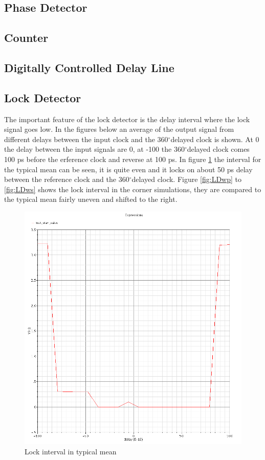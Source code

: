 \documentclass[a4paper,12pt]{article} \usepackage{graphicx}
\newcommand{\degree}{\ensuremath{^\circ}}
\begin{document}
\subsection{Phase Detector}
\subsection{Counter}
\subsection{Digitally Controlled Delay Line}
\subsection{Lock Detector}
The important feature of the lock detector is the delay interval where
the lock signal goes low. In the figures below an average of the
output signal from different delays between the input clock and the
360\degree delayed clock is shown. At 0 the delay between the input
signals are 0, at -100 the 360\degree delayed clock comes 100 ps
before the erference clock and reverse at 100 ps. In figure
\ref{fig:LDtm} the interval for the typical mean can be seen, it is
quite even and it locks on about 50 ps delay between the reference
clock and the 360\degree delayed clock. Figure \ref{fig:LDwp} to
\ref{fig:LDws} shows the lock interval in the corner simulations, they
are compared to the typical mean fairly uneven and shifted to the
right. 

\begin{figure}[h]
  \centering
  \includegraphics[width=5in]{../Bilder/LD_tran/LD_lsim_tm.png}
  \caption{Lock interval in typical mean}
  \label{fig:LDtm}
\end{figure}
\end{document}
